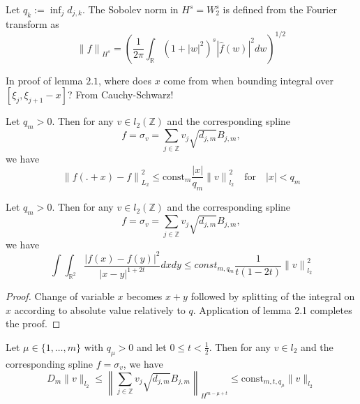 \documentclass[a4paper, 11pt]{article}
\begin{document}
Let $q_k := \inf_j d_{j,k}$. The Sobolev norm in $H^s = W^s_2$ is defined from the Fourier transform as
\begin{equation}
  {\| f \|}_{H^s} = {\left(\frac{1}{2\pi} \int_{\mathbb{R}} {(1+|w|^2)}^s |\hat{f}(w)|^2 dw \right)}^{1/2}
\end{equation}

In proof of lemma $2.1$, where does $x$ come from when bounding integral over $[\xi_j, \xi_{j+1}-x]$? From 
Cauchy-Schwarz!

\begin{lem}{2.1}
  Let $q_m > 0$. Then for any $v \in l_2(\mathbb{Z})$ and the corresponding spline
  \begin{equation*}
    f = \sigma_v  = \sum_{j \in \mathbb{Z}} v_j \sqrt{d_{j,m}} B_{j,m},
  \end{equation*}
  we have 
  \begin{equation}
    {\| f(.+x) - f\|}_{L_2}^2 \leq \text{const}_m \frac{|x|}{q_m} {\|v\|}_{l_2}^2 \quad \text{for} \quad |x| < q_m
  \end{equation}
\end{lem}

\begin{lem}{2.2}
  Let $q_m > 0$. Then for any $v \in l_2(\mathbb{Z})$ and the corresponding spline
  \begin{equation*}
    f = \sigma_v  = \sum_{j \in \mathbb{Z}} v_j \sqrt{d_{j,m}} B_{j,m},
  \end{equation*}
  we have
  \begin{equation}
    \int \int_{\mathbb{R}^2} \frac{|f(x)-f(y)|^2}{{|x-y|}^{1+2t}} dx dy \leq const_{m, q_m} \frac{1}{t(1-2t)} 
    {\|v\|}_{l_2}^2
  \end{equation}
\end{lem}

\begin{proof} Change of variable $x$ becomes $x+y$ followed by splitting of the integral on $x$ according to absolute 
value relatively to $q$. Application of lemma 2.1 completes the proof.
\end{proof}

\begin{thm}{1}
  Let $\mu \in \{1, \ldots, m\}$ with $q_{\mu} > 0$ and let $0 \leq t < \frac{1}{2}$. Then for any $v \in l_2$ and the 
  corresponding spline $f = \sigma_v$, we have
  \begin{equation}
    D_m \|v\|_{l_2} \leq {\left\| \sum_{j \in \mathbb{Z}} v_j \sqrt{d_{j,m}} B_{j,m} \right\|}_{H^{m-\mu+t}} \leq 
    \text{const}_{m,t,q_{\mu}}\|v\|_{l_2}
  \end{equation}
\end{thm}
\end{document}

